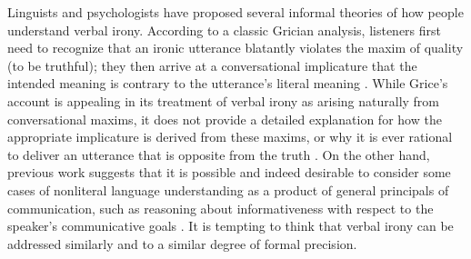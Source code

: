 \documentclass[10pt,letterpaper]{article}
\begin{document}
Linguists and psychologists have proposed several informal theories of how people understand verbal irony. According to a classic Grician analysis, listeners first need to recognize that an ironic utterance blatantly violates the maxim of quality (to be truthful); they then arrive at a conversational implicature that the intended meaning is contrary to the utterance's literal meaning \cite{grice20134, wilson2006pragmatics}. While Grice's account is appealing in its treatment of verbal irony as arising naturally from conversational maxims, it does not provide a detailed explanation for how the appropriate implicature is derived from these maxims, or why it is ever rational to deliver an utterance that is opposite from the truth \cite{wilson2006pragmatics}. 
On the other hand, previous work suggests that it is possible and indeed desirable to consider some cases of nonliteral language understanding as a product of general principals of communication, such as reasoning about informativeness with respect to the speaker's communicative goals \cite{kao2014nonliteral, kao2014formalizing}. It is tempting to think that verbal irony can be addressed similarly and to a similar degree of formal precision.
\end{document}
